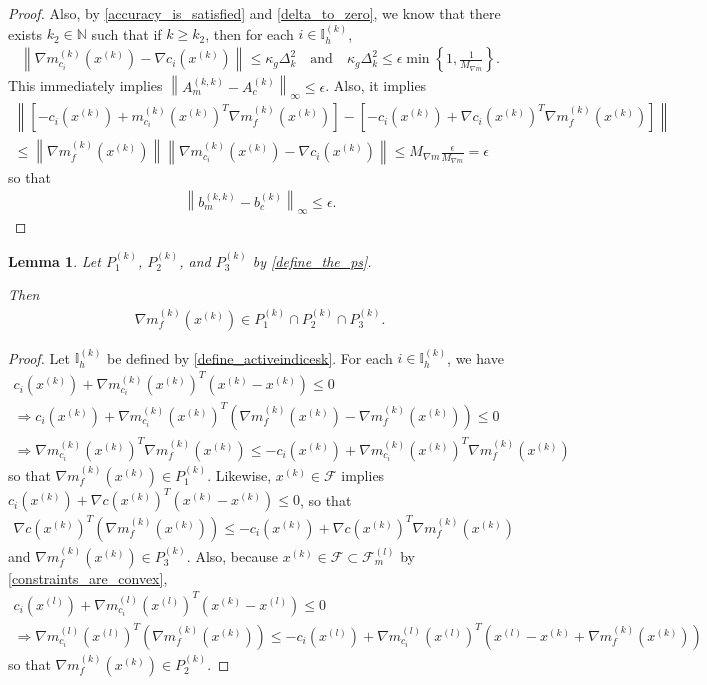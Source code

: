 \documentclass{article}
\newtheorem{lemma}[theorem]{Lemma}
\theoremstyle{case}
\numberwithin{theorem}{subsection}
\newcommand{\dk}{\Delta_k}
\newcommand{\feasiblel}{{\mathcal F_m^{(l)}}}
\newcommand{\feasible}{{\mathcal F}}
\newcommand{\gk}{{\nabla m_f^{(k)}\left(\xk\right)}}
\newcommand{\gmcik}{{\nabla m_{c_i}^{(k)}\left(\xk\right)}}
\newcommand{\gmcil}{{\nabla m_{c_i}^{(l)}\left(\xl\right)}}
\newcommand{\mcik}{{{m}^{(k)}_{c_i}}}
\newcommand{\naturals}{\mathbb N}
\newcommand{\xk}{x^{(k)}}
\newcommand{\xl}{{x^{(l)}}}
\newcommand{\maxmodelgrad}{{M_{\nabla m}}}
\newcommand{\activeindicesk}{{ \mathbb I_h^{(k)} }}
\begin{document}
\begin{proof}
Also, by
\cref{accuracy_is_satisfied} and \cref{delta_to_zero}, we know that there exists $k_2 \in \naturals$ such that if $k \ge k_2$, 
then for each $i \in \activeindicesk$,
\begin{align*}
\left\|\gmcik - \nabla c_i\left(\xk\right)\right\| \le \kappa_g \dk^2
\quad \textrm{and} \quad
\kappa_g \dk^2 \le \epsilon \min\left\{1, \frac {1}{\maxmodelgrad}\right\}.
\end{align*}
This immediately implies $\left\|A_{m}^{(k, k)} - A_{c}^{(k)}\right\|_{\infty} \le \epsilon$.
Also, it implies
\begin{align*}
\left\|
\left[-c_i\left(\xk\right) + \mcik\left(\xk\right)^T\gk\right] -
\left[ -c_i\left(\xk\right) + \nabla c_i\left(\xk\right)^T\gk\right]
\right\| \\
\le \left\|\gk\right\| \left\|\gmcik - \nabla c_i\left(\xk\right)\right\|
\le \maxmodelgrad \frac {\epsilon}{\maxmodelgrad} = \epsilon
\end{align*}
so that
\begin{align*}
\left\|b_{m}^{(k, k)} - b_{c}^{(k)}\right\|_{\infty} \le \epsilon.
\end{align*}

\end{proof}

\begin{lemma}
\label{the_gradient_is_in_em_all}
Let $P^{(k)}_1$, $P^{(k)}_2$, and $P^{(k)}_3$ by \cref{define_the_ps}.

Then
\begin{align*}
\gk \in P^{(k)}_1 \cap P^{(k)}_2 \cap P^{(k)}_3.
\end{align*}
\end{lemma}
\begin{proof}
Let $\activeindicesk$ be defined by \cref{define_activeindicesk}.
For each $i \in \activeindicesk$, we have
\begin{align*}
c_i\left(\xk\right) + \gmcik^T \left(\xk - \xk\right)  \le 0 \\
\Longrightarrow c_i\left(\xk\right) + \gmcik^T \left(\gk - \gk \right)  \le 0 \\
\Longrightarrow \gmcik^T \gk  \le -c_i\left(\xk\right) + \gmcik^T\gk
\end{align*}
so that $\gk \in P_1^{(k)}$.
Likewise, $\xk \in \feasible$ implies $c_i\left(\xk\right) + \nabla c\left(\xk\right)^T \left(\xk-\xk\right)  \le 0$, so that
\begin{align*}
\nabla c\left(\xk\right)^T \left(\gk\right)  \le -c_i\left(\xk\right) + \nabla c\left(\xk\right)^T\gk
\end{align*}
and $\gk \in P_3^{(k)}$.
Also, because $\xk \in \feasible \subset \feasiblel$ by \cref{constraints_are_convex},
\begin{align*}
c_i\left(\xl\right) + \gmcil^T \left(\xk - \xl\right) \le 0 \\
\Longrightarrow \gmcil^T \left(\gk\right) \le -c_i\left(\xl\right) + \gmcil^T\left(\xl - \xk + \gk\right)
\end{align*}
so that $\gk \in P_2^{(k)}$.
\end{proof}
\end{document}
